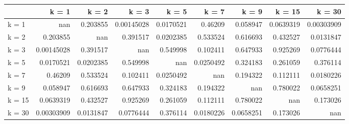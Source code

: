 \begin{tabular}{lrrrrrrrr}
\toprule
        &        k = 1 &       k = 2 &        k = 3 &       k = 5 &       k = 7 &       k = 9 &      k = 15 &       k = 30 \\
\midrule
 k = 1  & nan          &   0.203855  &   0.00145028 &   0.0170521 &   0.46209   &   0.058947  &   0.0639319 &   0.00303909 \\
 k = 2  &   0.203855   & nan         &   0.391517   &   0.0202385 &   0.533524  &   0.616693  &   0.432527  &   0.0131847  \\
 k = 3  &   0.00145028 &   0.391517  & nan          &   0.549998  &   0.102411  &   0.647933  &   0.925269  &   0.0776444  \\
 k = 5  &   0.0170521  &   0.0202385 &   0.549998   & nan         &   0.0250492 &   0.324183  &   0.261059  &   0.376114   \\
 k = 7  &   0.46209    &   0.533524  &   0.102411   &   0.0250492 & nan         &   0.194322  &   0.112111  &   0.0180226  \\
 k = 9  &   0.058947   &   0.616693  &   0.647933   &   0.324183  &   0.194322  & nan         &   0.780022  &   0.0658251  \\
 k = 15 &   0.0639319  &   0.432527  &   0.925269   &   0.261059  &   0.112111  &   0.780022  & nan         &   0.173026   \\
 k = 30 &   0.00303909 &   0.0131847 &   0.0776444  &   0.376114  &   0.0180226 &   0.0658251 &   0.173026  & nan          \\
\bottomrule
\end{tabular}